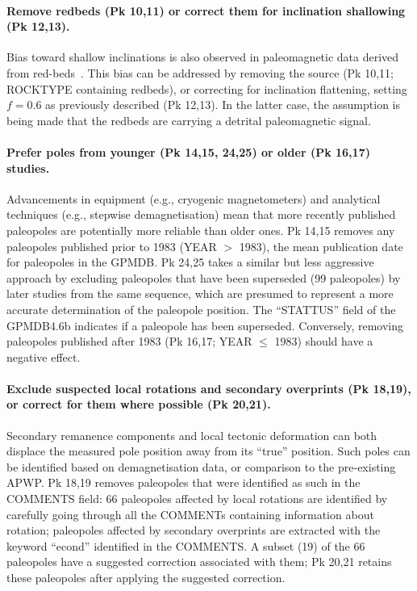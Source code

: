 \paragraph{Remove redbeds (Pk 10,11) or correct them for inclination
shallowing (Pk 12,13).} Bias toward shallow inclinations is also observed
in paleomagnetic data derived from red-beds~\cite[e.g., in central Asia,
Mediterranean region, North America, etc.]{T04,K04,T07,B10}. This bias can be
addressed by removing the source (Pk 10,11; ROCKTYPE containing redbeds), or
correcting for inclination flattening, setting $f=0.6$ as previously described
(Pk 12,13). In the latter case, the assumption is being made that the
redbeds are carrying a detrital paleomagnetic signal.

\paragraph{Prefer poles from younger (Pk 14,15, 24,25) or older (Pk 16,17)
studies.} Advancements in equipment (e.g., cryogenic magnetometers) and
analytical techniques (e.g., stepwise demagnetisation) mean that more recently
published paleopoles are potentially more reliable than older ones. Pk 14,15
removes any paleopoles published prior to 1983 (YEAR $>$ 1983), the mean
publication date for paleopoles in the GPMDB\@. Pk 24,25 takes a similar but
less aggressive approach by excluding paleopoles that have been superseded (99
paleopoles) by later studies from the same sequence, which are presumed to
represent a more accurate determination of the paleopole position. The
``STATTUS'' field of the GPMDB4.6b indicates if a paleopole has been superseded.
Conversely, removing paleopoles published after 1983 (Pk 16,17; YEAR $\leq$
1983) should have a negative effect.

\paragraph{Exclude suspected local rotations and secondary overprints (Pk
18,19), or correct for them where possible (Pk 20,21).} Secondary remanence
components and local tectonic deformation can both displace the measured pole
position away from its ``true'' position. Such poles can be identified based on
demagnetisation data, or comparison to the pre-existing APWP\@. Pk 18,19
removes paleopoles that were identified as such in the COMMENTS field: 66
paleopoles affected by local rotations are identified by carefully going through
all the COMMENTs containing information about rotation; paleopoles affected by
secondary overprints are extracted with the keyword ``econd'' identified in the
COMMENTS\@. A subset (19) of the 66 paleopoles have a suggested correction
associated with them; Pk 20,21 retains these paleopoles after applying the
suggested correction.

